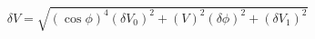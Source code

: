 \begin{equation}
\label{eq:delta_V_Malus}
\delta V = \sqrt{ \left(\cos{\phi}\right)^4(\delta V_0)^2 + \left(V\right)^2(\delta \phi)^2+ (\delta V_1)^2}
\end{equation}